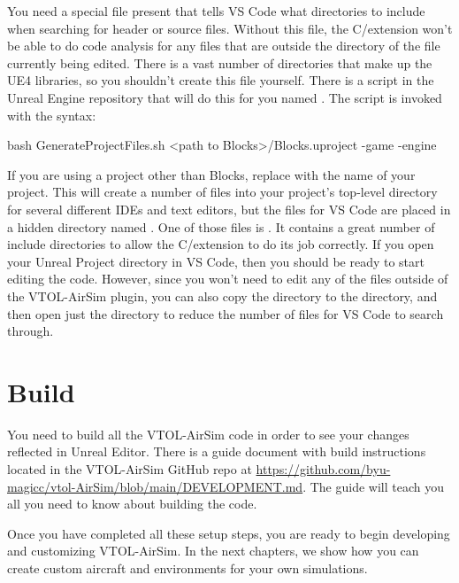 You need a special  file present that tells VS Code what directories to include when searching for \CC header or source files. Without this file, the C/\CC extension won't be able to do code analysis for any files that are outside the directory of the file currently being edited. There is a vast number of directories that make up the UE4 libraries, so you shouldn't create this file yourself. There is a script in the Unreal Engine repository that will do this for you named . The script is invoked with the syntax:
\begin{minttcb}[title={}]{bash}
GenerateProjectFiles.sh <path to Blocks>/Blocks.uproject -game -engine
\end{minttcb}
If you are using a project other than Blocks, replace  with the name of your project. This will create a number of files into your project's top-level directory for several different IDEs and text editors, but the files for VS Code are placed in a hidden directory named . One of those files is . It contains a great number of include directories to allow the C/\CC extension to do its job correctly. If you open your Unreal Project directory in VS Code, then you should be ready to start editing the code. However, since you won't need to edit any of the files outside of the VTOL-AirSim plugin, you can also copy the  directory to the  directory, and then open just the  directory to reduce the number of files for VS Code to search through.

\section{Build}
You need to build all the VTOL-AirSim code in order to see your changes reflected in Unreal Editor. There is a guide document with build instructions located in the VTOL-AirSim GitHub repo at \url{https://github.com/byu-magicc/vtol-AirSim/blob/main/DEVELOPMENT.md}. The guide will teach you all you need to know about building the code.

Once you have completed all these setup steps, you are ready to begin developing and customizing VTOL-AirSim. In the next chapters, we show how you can create custom aircraft and environments for your own simulations.